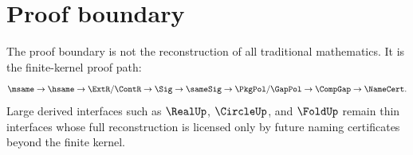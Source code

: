 \section*{Proof boundary}

The proof boundary is not the reconstruction of all traditional mathematics. It is the finite-kernel proof path:
$$
\msame\to \hsame\to \ExtR/\ContR\to \Sig\to \sameSig\to \PkgPol/\GapPol\to \CompGap\to \NameCert.
$$
Large derived interfaces such as \(\RealUp\), \(\CircleUp\), and \(\FoldUp\) remain thin interfaces whose full reconstruction is licensed only by future naming certificates beyond the finite kernel.
